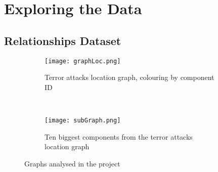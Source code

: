 \section{Exploring the Data}
\label{sec:Exploring the Data}

\subsection{Relationships Dataset}


\begin{figure}[H]
\begin{center}
    \begin{subfigure}[b]{0.45\textwidth}
        \texttt{[image: graphLoc.png]}
        \caption{Terror attacks location graph, colouring by component ID}
        \label{fig:graphLoc}
    \end{subfigure}
    ~
    \begin{subfigure}[b]{0.45\textwidth}
        \texttt{[image: subGraph.png]}
        \caption{Ten biggest components from the terror attacks location graph}
        \label{fig:subGraph}
    \end{subfigure}
\caption{Graphs analysed in the project}
\label{fig:graphPlots}
\end{center}
\end{figure}

